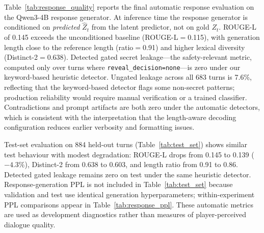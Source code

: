\documentclass[11pt]{article}
\begin{document}
Table~\ref{tab:response_quality} reports the final automatic response evaluation on the Qwen3-4B response generator.
At inference time the response generator is conditioned on \textit{predicted} $\hat{Z}_t$ from the latent predictor, not on gold $Z_t$.
ROUGE-L of 0.145 exceeds the unconditioned baseline (ROUGE-L$=$0.115), with generation length close to the reference length (ratio$=$0.91) and higher lexical diversity (Distinct-2$=$0.638).
Detected gated secret leakage---the safety-relevant metric, computed only over turns where \texttt{reveal\_decision=none}---is zero under our keyword-based heuristic detector.
Ungated leakage across all 683 turns is 7.6\%, reflecting that the keyword-based detector flags some non-secret patterns; production reliability would require manual verification or a trained classifier.
Contradictions and prompt artifacts are both zero under the automatic detectors, which is consistent with the interpretation that the length-aware decoding configuration reduces earlier verbosity and formatting issues.

Test-set evaluation on 884 held-out turns (Table~\ref{tab:test_set}) shows similar test behaviour with modest degradation: ROUGE-L drops from 0.145 to 0.139 ($-4.3\%$), Distinct-2 from 0.638 to 0.603, and length ratio from 0.91 to 0.86. Detected gated leakage remains zero on test under the same heuristic detector.
Response-generation PPL is not included in Table~\ref{tab:test_set} because validation and test use identical generation hyperparameters; within-experiment PPL comparisons appear in Table~\ref{tab:response_ppl}.
These automatic metrics are used as development diagnostics rather than measures of player-perceived dialogue quality.
\end{document}

